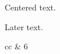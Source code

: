 \documentclass{aastex631}
\begin{document}
\begin{center}
Centered text.
\end{center}
Later text.
\begin{deluxetable}{cc}
 & 6 \\
\enddata
\end{deluxetable}
\end{document}
